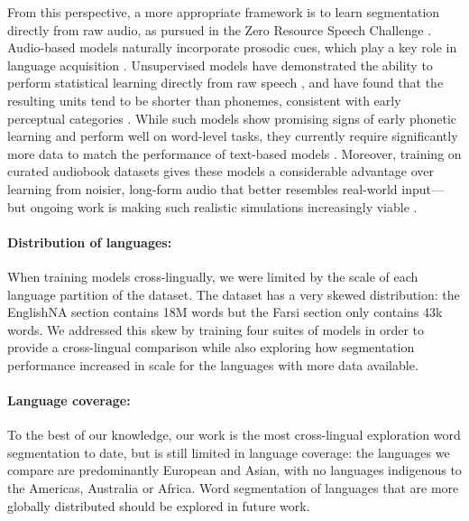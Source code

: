 From this perspective, a more appropriate framework is to learn segmentation directly from raw audio, as pursued in the Zero Resource Speech Challenge \citep{nguyen2020zero, dunbar2021zero}. Audio-based models naturally incorporate prosodic cues, which play a key role in language acquisition \citep{Cutler1987, Jusczyk1993stress, jusczyk-1999-stress-voice}. Unsupervised models have demonstrated the ability to perform statistical learning directly from raw speech \citep{lavechin2022can, seyssel-2023-realistic}, and have found that the resulting units tend to be shorter than phonemes, consistent with early perceptual categories \citep{schatz2021early}. While such models show promising signs of early phonetic learning and perform well on word-level tasks, they currently require significantly more data to match the performance of text-based models \citep{lavechin}. Moreover, training on curated audiobook datasets gives these models a considerable advantage over learning from noisier, long-form audio that better resembles real-world input—but ongoing work is making such realistic simulations increasingly viable \citep{lavechin2024modeling}.

\paragraph{Distribution of languages:} When training models cross-lingually, we were limited by the scale of each language partition of the \ipachildes dataset. The dataset has a very skewed distribution: the EnglishNA section contains 18M words but the Farsi section only contains 43k words. We addressed this skew by training four suites of models in order to provide a cross-lingual comparison while also exploring how segmentation performance increased in scale for the languages with more data available.

\paragraph{Language coverage:}
To the best of our knowledge, our work is the most cross-lingual exploration word segmentation to date, but is still limited in language coverage: the languages we compare are predominantly European and Asian, with no languages indigenous to the Americas, Australia or Africa. Word segmentation of languages that are more globally distributed should be explored in future work.


